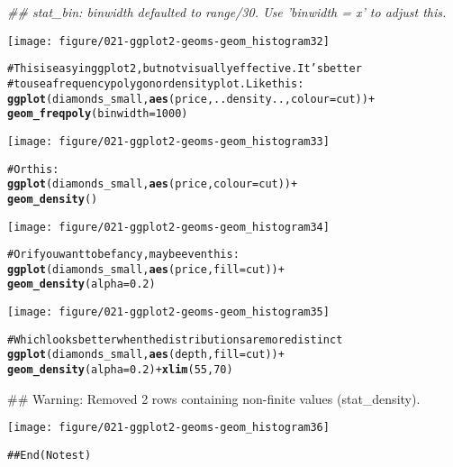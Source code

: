 \documentclass[a4paper,titlepage]{tufte-handout}\usepackage{graphicx, color}
\makeatletter
\def\maxwidth{ %
  \ifdim\Gin@nat@width>\linewidth
    \linewidth
  \else
    \Gin@nat@width
  \fi
}
\newcommand{\hlfunctioncall}[1]{\textcolor[rgb]{0.501960784313725,0,0.329411764705882}{\textbf{#1}}}%
\newcommand{\hlcomment}[1]{\textcolor[rgb]{0.180392156862745,0.6,0.341176470588235}{#1}}%
\newenvironment{kframe}{%
 \def\at@end@of@kframe{}%
 \ifinner\ifhmode%
  \def\at@end@of@kframe{\end{minipage}}%
  \begin{minipage}{\columnwidth}%
 \fi\fi%
 \def\FrameCommand##1{\hskip\@totalleftmargin \hskip-\fboxsep
 \colorbox{shadecolor}{##1}\hskip-\fboxsep
     \hskip-\linewidth \hskip-\@totalleftmargin \hskip\columnwidth}%
 \MakeFramed {\advance\hsize-\width
   \@totalleftmargin\z@ \linewidth\hsize
   \@setminipage}}%
 {\par\unskip\endMakeFramed%
 \at@end@of@kframe}
\newenvironment{knitrout}{}{} %
\makeatother
\begin{document}
\begin{knitrout}
\begin{kframe}
{\ttfamily\noindent\itshape\textcolor{messagecolor}{\#\# stat\_bin: binwidth defaulted to range/30. Use 'binwidth = x' to adjust this.}}\end{kframe}
\texttt{[image: figure/021-ggplot2-geoms-geom\_histogram32]} 
\begin{kframe}\begin{alltt}

\hlcomment{# This is easy in ggplot2, but not visually effective.  It's better}
\hlcomment{# to use a frequency polygon or density plot.  Like this:}
\hlfunctioncall{ggplot}(diamonds_small, \hlfunctioncall{aes}(price, ..density.., colour = cut)) +
  \hlfunctioncall{geom_freqpoly}(binwidth = 1000)
\end{alltt}
\end{kframe}
\texttt{[image: figure/021-ggplot2-geoms-geom\_histogram33]} 
\begin{kframe}\begin{alltt}
\hlcomment{# Or this:}
\hlfunctioncall{ggplot}(diamonds_small, \hlfunctioncall{aes}(price, colour = cut)) +
  \hlfunctioncall{geom_density}()
\end{alltt}
\end{kframe}
\texttt{[image: figure/021-ggplot2-geoms-geom\_histogram34]} 
\begin{kframe}\begin{alltt}
\hlcomment{# Or if you want to be fancy, maybe even this:}
\hlfunctioncall{ggplot}(diamonds_small, \hlfunctioncall{aes}(price, fill = cut)) +
  \hlfunctioncall{geom_density}(alpha = 0.2)
\end{alltt}
\end{kframe}
\texttt{[image: figure/021-ggplot2-geoms-geom\_histogram35]} 
\begin{kframe}\begin{alltt}
\hlcomment{# Which looks better when the distributions are more distinct}
\hlfunctioncall{ggplot}(diamonds_small, \hlfunctioncall{aes}(depth, fill = cut)) +
  \hlfunctioncall{geom_density}(alpha = 0.2) + \hlfunctioncall{xlim}(55, 70)
\end{alltt}


{\ttfamily\noindent\textcolor{warningcolor}{\#\# Warning: Removed 2 rows containing non-finite values (stat\_density).}}\end{kframe}
\texttt{[image: figure/021-ggplot2-geoms-geom\_histogram36]} 
\begin{kframe}\begin{alltt}
\hlcomment{## End(No test)}


\end{alltt}
\end{kframe}
\end{knitrout}
\end{document}

